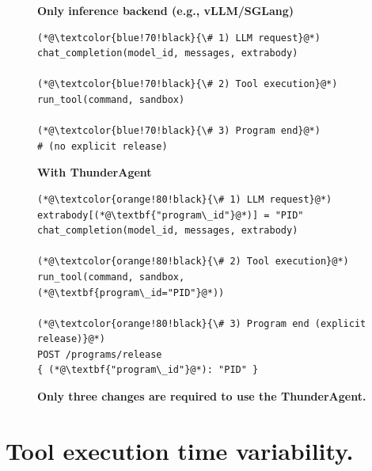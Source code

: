 \begin{figure}[!htbp]
\centering

\begin{minipage}[t]{0.485\linewidth}
\centering
\textbf{Only inference backend (e.g., vLLM/SGLang)}\\[-2pt]
\begin{tcolorbox}[
  colback=black!3,
  colframe=black!35,
  boxrule=0.4pt,
  arc=1.2pt,
  left=4pt,right=4pt,top=3pt,bottom=3pt
]
\begin{lstlisting}[style=req]
(*@\textcolor{blue!70!black}{\# 1) LLM request}@*)
chat_completion(model_id, messages, extrabody)

(*@\textcolor{blue!70!black}{\# 2) Tool execution}@*)
run_tool(command, sandbox)

(*@\textcolor{blue!70!black}{\# 3) Program end}@*)
# (no explicit release)
\end{lstlisting}
\end{tcolorbox}
\end{minipage}
\hfill
\begin{minipage}[t]{0.485\linewidth}
\centering
\textbf{With ThunderAgent}\\[-2pt]
\begin{tcolorbox}[
  colback=black!3,
  colframe=black!35,
  boxrule=0.4pt,
  arc=1.2pt,
  left=4pt,right=4pt,top=3pt,bottom=3pt
]
\begin{lstlisting}[style=req]
(*@\textcolor{orange!80!black}{\# 1) LLM request}@*)
extrabody[(*@\textbf{"program\_id"}@*)] = "PID"
chat_completion(model_id, messages, extrabody)

(*@\textcolor{orange!80!black}{\# 2) Tool execution}@*)
run_tool(command, sandbox, (*@\textbf{program\_id="PID"}@*))

(*@\textcolor{orange!80!black}{\# 3) Program end (explicit release)}@*)
POST /programs/release
{ (*@\textbf{"program\_id"}@*): "PID" }
\end{lstlisting}
\end{tcolorbox}
\end{minipage}

\caption{\textbf{Only three changes are required to use the ThunderAgent.}}
\label{fig:router-minimal-changes}
\end{figure}






\newpage
\section{Tool execution time variability.}
\label{app:tool_var}

